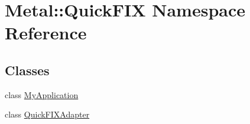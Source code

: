 \hypertarget{namespaceMetal_1_1QuickFIX}{}\section{Metal\+:\+:Quick\+F\+I\+X Namespace Reference}
\label{namespaceMetal_1_1QuickFIX}
\subsection*{Classes}
\begin{DoxyCompactItemize}
\item 
class \hyperlink{classMetal_1_1QuickFIX_1_1MyApplication}{My\+Application}
\item 
class \hyperlink{classMetal_1_1QuickFIX_1_1QuickFIXAdapter}{Quick\+F\+I\+X\+Adapter}
\end{DoxyCompactItemize}
